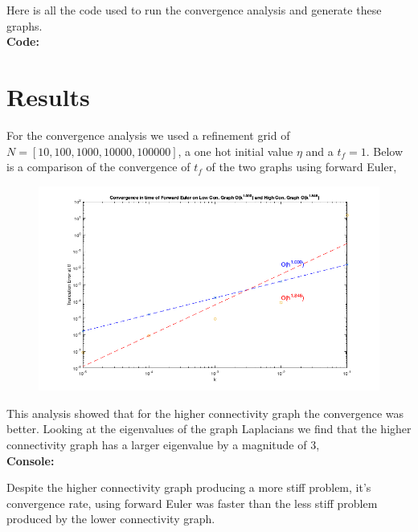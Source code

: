 \documentclass[11pt]{article}
\begin{document}
Here is all the code used to run the convergence analysis and generate these graphs.\\

\textbf{Code:}
\begin{center}
    
\end{center} 

\section{Results}  
For the convergence analysis we used a refinement grid of $N = [10, 100, 1000, 10000, 100000]$, a one hot initial value $\eta$ and a 
$t_f = 1$. Below is a comparison of the convergence of $t_f$ of the two graphs using forward Euler, 

\begin{figure}[H]
    \begin{center}
      \includegraphics[width=\textwidth]{ForwardEuler.png}
    \end{center}
  \end{figure}

This analysis showed that for the higher connectivity graph the convergence was better. Looking at the eigenvalues of the graph Laplacians
we find that the higher connectivity graph has a larger eigenvalue by a magnitude of 3,\\

\textbf{Console:}
\begin{center}
    
\end{center} 

Despite the higher connectivity graph producing a more stiff problem, it's convergence rate, using forward Euler was faster than the less 
stiff problem produced by the lower connectivity graph. 
\end{document}
